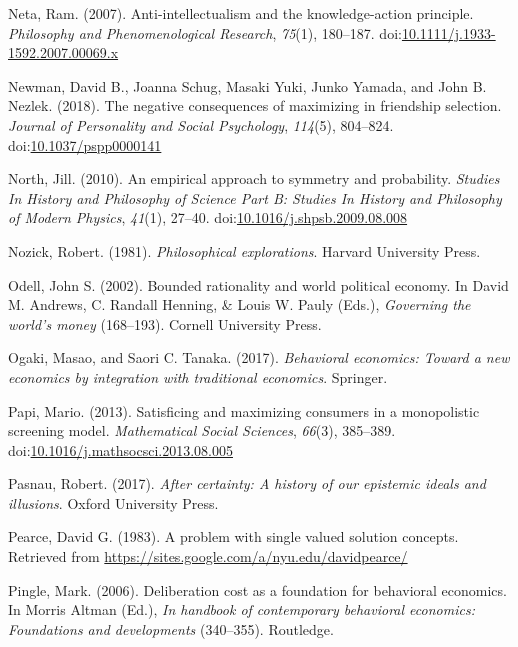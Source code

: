 \documentclass[
  12pt,
  letterpaper,
]{scrbook}
\newlength{\cslhangindent}
\newenvironment{CSLReferences}[2] %
 {\begin{list}{}{%
  \setlength{\itemindent}{0pt}
  \setlength{\leftmargin}{0pt}
  \setlength{\parsep}{0pt}
  \ifodd #1
   \setlength{\leftmargin}{\cslhangindent}
   \setlength{\itemindent}{-1\cslhangindent}
  \fi
  \setlength{\itemsep}{#2\baselineskip}}}
 {\end{list}}
\begin{document}
\begin{CSLReferences}{1}{0}
Neta, Ram. (2007). Anti-intellectualism and the knowledge-action
principle. \emph{Philosophy and Phenomenological Research},
\emph{75}(1), 180--187.
doi:\href{https://doi.org/10.1111/j.1933-1592.2007.00069.x}{10.1111/j.1933-1592.2007.00069.x}

Newman, David B., Joanna Schug, Masaki Yuki, Junko Yamada, and John B.
Nezlek. (2018). The negative consequences of maximizing in friendship
selection. \emph{Journal of Personality and Social Psychology},
\emph{114}(5), 804--824.
doi:\href{https://doi.org/10.1037/pspp0000141}{10.1037/pspp0000141}

North, Jill. (2010). An empirical approach to symmetry and probability.
\emph{Studies In History and Philosophy of Science Part B: Studies In
History and Philosophy of Modern Physics}, \emph{41}(1), 27--40.
doi:\href{https://doi.org/10.1016/j.shpsb.2009.08.008}{10.1016/j.shpsb.2009.08.008}

Nozick, Robert. (1981). \emph{Philosophical explorations}. Harvard
University Press.

Odell, John S. (2002). Bounded rationality and world political economy.
In David M. Andrews, C. Randall Henning, \& Louis W. Pauly (Eds.),
\emph{Governing the world's money} (168--193). Cornell University Press.

Ogaki, Masao, and Saori C. Tanaka. (2017). \emph{Behavioral economics:
Toward a new economics by integration with traditional economics}.
Springer.

Papi, Mario. (2013). Satisficing and maximizing consumers in a
monopolistic screening model. \emph{Mathematical Social Sciences},
\emph{66}(3), 385--389.
doi:\href{https://doi.org/10.1016/j.mathsocsci.2013.08.005}{10.1016/j.mathsocsci.2013.08.005}

Pasnau, Robert. (2017). \emph{After certainty: A history of our
epistemic ideals and illusions}. Oxford University Press.

Pearce, David G. (1983). A problem with single valued solution concepts.
Retrieved from \url{https://sites.google.com/a/nyu.edu/davidpearce/}

Pingle, Mark. (2006). Deliberation cost as a foundation for behavioral
economics. In Morris Altman (Ed.), \emph{In handbook of contemporary
behavioral economics: Foundations and developments} (340--355).
Routledge.


\end{CSLReferences}
\end{document}
